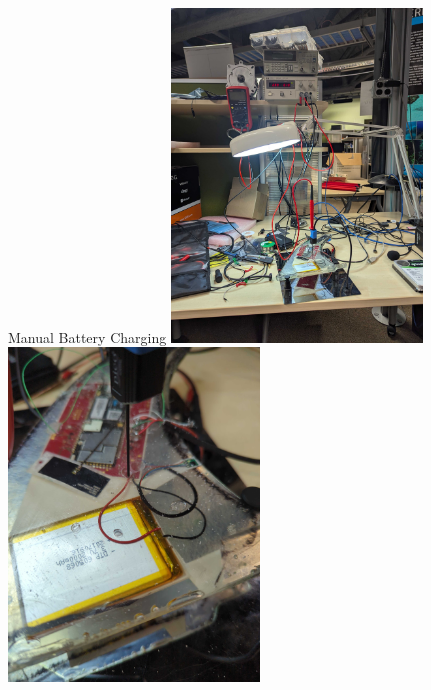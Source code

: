 \begin{frame}{Manual Battery Charging}
    \centering
    \includegraphics[height=0.6\textheight,width=0.5\textwidth,keepaspectratio]{images/sf_battery_charge_setup.jpg}    
    \includegraphics[height=0.6\textheight,width=0.5\textwidth,keepaspectratio]{images/sf_battery_connection.jpg}    
\end{frame}
